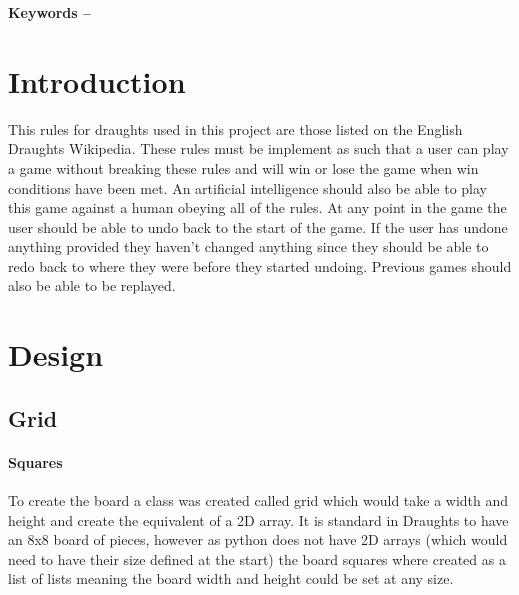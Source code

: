 \documentclass[10pt, a4paper]{article}
\title{\mytitle}
\author{\myauthor\hspace{1em}\\\contact\\Edinburgh Napier University\hspace{0.5em}-\hspace{0.5em}\mymodule}
\date{}
\begin{document}
	\maketitle
	\begin{abstract}
		This project aims to create playable Draughts in Python using the most useful and relevant algorithms and data structures. It should be possible to play this with two human players as well as with one human player against the computer. It should be possible to undo, redo and replay the games.
	\end{abstract}
    
	\textbf{Keywords -- }{\mykeywords}
	\section{Introduction}
	This rules for draughts used in this project are those listed on the English Draughts Wikipedia\cite{Rules}. These rules must be implement as such that a user can play a game without breaking these rules and will win or lose the game when win conditions have been met. An artificial intelligence should also be able to play this game against a human obeying all of the rules. At any point in the game the user should be able to undo back to the start of the game. If the user has undone anything provided they haven't changed anything since they should be able to redo back to where they were before they started undoing. Previous games should also be able to be replayed.
    
    \section{Design}
    \subsection{Grid}
    \paragraph{Squares}
    To create the board a class was created called grid which would take a width and height and create the equivalent of a 2D array. It is standard in Draughts to have an 8x8 board of pieces, however as python does not have 2D arrays (which would need to have their size defined at the start) the board squares where created as a list of lists meaning the board width and height could be set at any size.
   	
\end{document}
